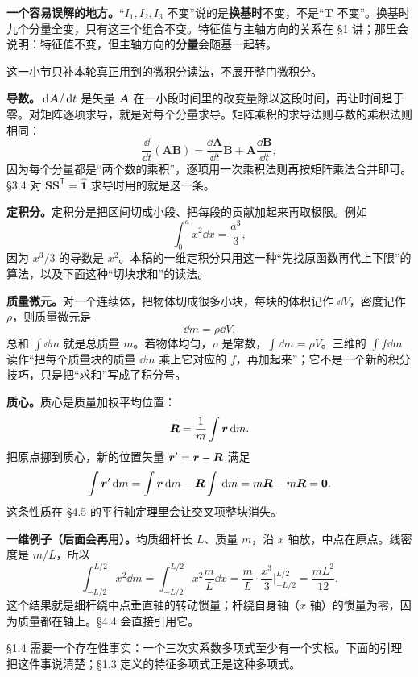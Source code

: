 \documentclass[11pt]{ctexart}
\newcommand{\ten}[1]{\mathbf{#1}}
\newcommand{\unitd}{\hat{\ten{1}}}
\let\origsubhdr\subhdr
\renewcommand{\subhdr}[1]{\par\needspace{3\baselineskip}\origsubhdr{#1}}
\begin{document}
\textbf{一个容易误解的地方。}“$I_1,I_2,I_3$ 不变”说的是\textbf{换基时}不变，不是“$\ten T$ 不变”。换基时九个分量全变，只有这三个组合不变。特征值与主轴方向的关系在 \S1 讲；那里会说明：特征值不变，但主轴方向的\textbf{分量}会随基一起转。

\label{subsec:calculus}

这一小节只补本轮真正用到的微积分读法，不展开整门微积分。

\textbf{导数。}$\,\mathrm{d}\boldsymbol{A}/\,\mathrm{d} t$ 是矢量 $\boldsymbol{A}$ 在一小段时间里的改变量除以这段时间，再让时间趋于零。对矩阵逐项求导，就是对每个分量求导。矩阵乘积的求导法则与数的乘积法则相同：
\[
\frac{\dd}{\dd t}(\ten A\ten B)=\frac{\dd\ten A}{\dd t}\ten B+\ten A\frac{\dd\ten B}{\dd t},
\]
因为每个分量都是“两个数的乘积”，逐项用一次乘积法则再按矩阵乘法合并即可。\S3.4 对 $\ten S\ten S^{\mathsf T}=\unitd$ 求导时用的就是这一条。

\textbf{定积分。}定积分是把区间切成小段、把每段的贡献加起来再取极限。例如
\[
\int_0^a x^2\dd x=\frac{a^3}{3},
\]
因为 $x^3/3$ 的导数是 $x^2$。本稿的一维定积分只用这一种“先找原函数再代上下限”的算法，以及下面这种“切块求和”的读法。

\textbf{质量微元。}对一个连续体，把物体切成很多小块，每块的体积记作 $\dd V$，密度记作 $\rho$，则质量微元是
\[
\dd m=\rho\dd V .
\]
总和 $\int\dd m$ 就是总质量 $m$。若物体均匀，$\rho$ 是常数，$\int\dd m=\rho V$。三维的 $\int f\dd m$ 读作“把每个质量块的质量 $\dd m$ 乘上它对应的 $f$，再加起来”；它不是一个新的积分技巧，只是把“求和”写成了积分号。

\textbf{质心。}质心是质量加权平均位置：
\[
\boldsymbol{R}=\frac{1}{m}\int\boldsymbol{r}\,\mathrm{d} m .
\]
把原点挪到质心，新的位置矢量 $\boldsymbol{r}'=\boldsymbol{r}-\boldsymbol{R}$ 满足
\[
\int\boldsymbol{r}'\,\mathrm{d} m=\int\boldsymbol{r}\,\mathrm{d} m-\boldsymbol{R}\int\,\mathrm{d} m=m\boldsymbol{R}-m\boldsymbol{R}=\boldsymbol{0} .
\]
这条性质在 \S4.5 的平行轴定理里会让交叉项整块消失。

\textbf{一维例子（后面会再用）。}均质细杆长 $L$、质量 $m$，沿 $x$ 轴放，中点在原点。线密度是 $m/L$，所以
\[
\int_{-L/2}^{L/2}x^2\dd m
=\int_{-L/2}^{L/2}x^2\frac{m}{L}\dd x
=\frac{m}{L}\cdot\frac{x^3}{3}\Big|_{-L/2}^{L/2}
=\frac{mL^2}{12}.
\]
这个结果就是细杆绕中点垂直轴的转动惯量；杆绕自身轴（$x$ 轴）的惯量为零，因为质量都在轴上。\S4.4 会直接引用它。

\label{subsec:realroot}

\S1.4 需要一个存在性事实：一个三次实系数多项式至少有一个实根。下面的引理把这件事说清楚；\S1.3 定义的特征多项式正是这种多项式。

\begin{center}
\end{center}
\end{document}
